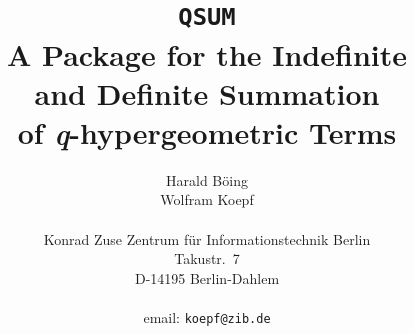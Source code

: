 
\title{{\tt QSUM}\\A Package for the Indefinite\\ and Definite Summation\\
of \textsl{q}-hypergeometric Terms}
\date{}
\author{Harald B\"oing\\
	Wolfram Koepf\\
	\\
	Konrad Zuse Zentrum f\"ur Informationstechnik Berlin \\
	Takustr.\ 7 \\
	D-14195 Berlin-Dahlem \\
	\\
	email: {\tt  koepf@zib.de}
}

\newcommand{\N} {\Bbb N}
\newcommand{\Z}{\Bbb Z}

\newcommand{\funkdef}[3]{\left\{\!\!\!\begin{array}{cc}
                                #1 & \!\!\!\mbox{\rm{if} $#2$ } \\
                                #3 & \!\!\!\mbox{\rm{otherwise}}
                                \end{array}
                         \right.}
\newcommand{\funkdefff}[6]{\left\{\begin{array}{ccc}
                                 #1 && \mbox{{if} $#2$ } \\
                                 #3 && \mbox{{if} $#4$ } \\
                                 #5 && \mbox{{if} $#6$ }
                                 \end{array}
                          \right.}

\newcommand{\qphihyp}[5]{{}_{#1}\phi_{#2}\left.\left[\begin{array}{c}
	#3 \\ #4 \end{array}\right|q,#5\right]}
\newcommand{\qpsihyp}[5]{{}_{#1}\psi_{#2}\left.\left[\begin{array}{c}
	#3 \\ #4 \end{array}\right|q,#5\right]}
\newcommand{\hyp}[5]{{}_{#1}F_{#2}\left.\left[\begin{array}{c}
	#3 \\ #4 \end{array}\right|#5\right]}

